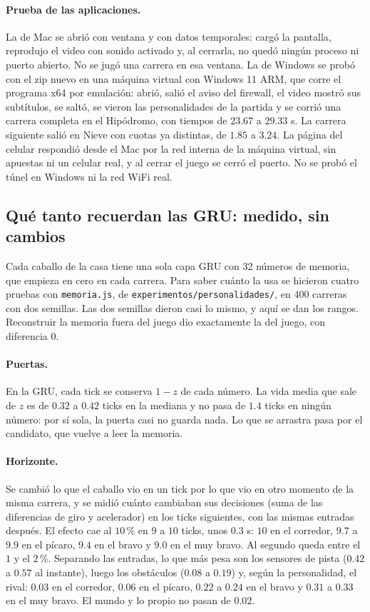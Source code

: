 \documentclass[11pt,letterpaper]{article}
\begin{document}
\paragraph{Prueba de las aplicaciones.} La de Mac se abrió con ventana y con datos temporales: cargó la pantalla, reprodujo el video con sonido activado y, al cerrarla, no quedó ningún proceso ni puerto abierto. No se jugó una carrera en esa ventana. La de Windows se probó con el zip nuevo en una máquina virtual con Windows 11 ARM, que corre el programa x64 por emulación: abrió, salió el aviso del firewall, el video mostró sus subtítulos, se saltó, se vieron las personalidades de la partida y se corrió una carrera completa en el Hipódromo, con tiempos de $23.67$ a $29.33$ s. La carrera siguiente salió en Nieve con cuotas ya distintas, de $1.85$ a $3.24$. La página del celular respondió desde el Mac por la red interna de la máquina virtual, sin apuestas ni un celular real, y al cerrar el juego se cerró el puerto. No se probó el túnel en Windows ni la red WiFi real.

\subsection{Qué tanto recuerdan las GRU: medido, sin cambios}
Cada caballo de la casa tiene una sola capa GRU con 32 números de memoria, que empieza en cero en cada carrera. Para saber cuánto la usa se hicieron cuatro pruebas con \texttt{memoria.js}, de \texttt{experimentos/personalidades/}, en 400 carreras con dos semillas. Las dos semillas dieron casi lo mismo, y aquí se dan los rangos. Reconstruir la memoria fuera del juego dio exactamente la del juego, con diferencia $0$.

\paragraph{Puertas.} En la GRU, cada tick se conserva $1-z$ de cada número. La vida media que sale de $z$ es de $0.32$ a $0.42$ ticks en la mediana y no pasa de $1.4$ ticks en ningún número: por sí sola, la puerta casi no guarda nada. Lo que se arrastra pasa por el candidato, que vuelve a leer la memoria.

\paragraph{Horizonte.} Se cambió lo que el caballo vio en un tick por lo que vio en otro momento de la misma carrera, y se midió cuánto cambiaban sus decisiones (suma de las diferencias de giro y acelerador) en los ticks siguientes, con las mismas entradas después. El efecto cae al $10$\,\% en $9$ a $10$ ticks, unos $0.3$ s: $10$ en el corredor, $9.7$ a $9.9$ en el pícaro, $9.4$ en el bravo y $9.0$ en el muy bravo. Al segundo queda entre el $1$ y el $2$\,\%. Separando las entradas, lo que más pesa son los sensores de pista ($0.42$ a $0.57$ al instante), luego los obstáculos ($0.08$ a $0.19$) y, según la personalidad, el rival: $0.03$ en el corredor, $0.06$ en el pícaro, $0.22$ a $0.24$ en el bravo y $0.31$ a $0.33$ en el muy bravo. El mundo y lo propio no pasan de $0.02$.
\end{document}
